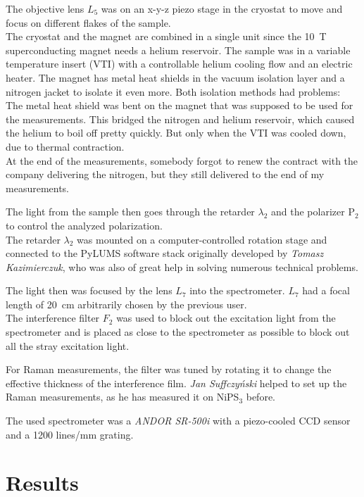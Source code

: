 \documentclass[
	twoside,
	parskip=half,
	a4paper,
]{scrbook}
\begin{document}
The objective lens $L_5$ was on an x-y-z piezo stage in the cryostat to move and focus on different flakes of the sample.\\
The cryostat and the magnet are combined in a single unit since the \SI{10}{T} superconducting magnet needs a helium reservoir.
The sample was in a variable temperature insert (VTI) with a controllable helium cooling flow and an electric heater.
The magnet has metal heat shields in the vacuum isolation layer and a nitrogen jacket to isolate it even more.
Both isolation methods had problems:\\
The metal heat shield was bent on the magnet that was supposed to be used for the measurements.
This bridged the nitrogen and helium reservoir, which caused the helium to boil off pretty quickly.
But only when the VTI was cooled down, due to thermal contraction.\\
At the end of the measurements, somebody forgot to renew the contract with the company delivering the nitrogen, but they still delivered to the end of my measurements.

The light from the sample then goes through the retarder $\lambda_2$ and the polarizer P$_2$ to control the analyzed polarization.\\
The retarder $\lambda_2$ was mounted on a computer-controlled rotation stage and connected to the PyLUMS software stack originally developed by \textit{Tomasz Kazimierczuk}, who was also of great help in solving numerous technical problems.

The light then was focused by the lens $L_7$ into the spectrometer.
$L_7$ had a focal length of \SI{20}{cm} arbitrarily chosen by the previous user.\\
The interference filter $F_2$ was used to block out the excitation light from the spectrometer and is placed as close to the spectrometer as possible to block out all the stray excitation light.

For Raman measurements, the filter was tuned by rotating it to change the effective thickness of the interference film.
\textit{Jan Suffczyński} helped to set up the Raman measurements, as he has measured it on NiPS$_3$ before. 

The used spectrometer was a \textit{ANDOR SR-500i} with a piezo-cooled CCD sensor and a 1200 lines/mm grating.


\chapter{Results}
\end{document}

